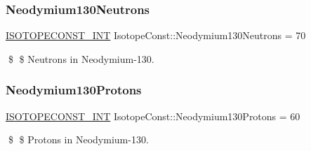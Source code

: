 \subsubsection{\texorpdfstring{Neodymium130\+Neutrons}{Neodymium130Neutrons}}
{\footnotesize\ttfamily \mbox{\hyperlink{group___isotope_const-_macros_ga5f18360b3e99483a35c32d789e62621c}{I\+S\+O\+T\+O\+P\+E\+C\+O\+N\+S\+T\+\_\+\+I\+NT}} Isotope\+Const\+::\+Neodymium130\+Neutrons = 70}

\$ \$ Neutrons in Neodymium-\/130. \mbox{\label{group___isotope_const-_neodymium-_nd130_gabfd553c6628d89c6bb9f44a4ee5091ab}} 
\subsubsection{\texorpdfstring{Neodymium130\+Protons}{Neodymium130Protons}}
{\footnotesize\ttfamily \mbox{\hyperlink{group___isotope_const-_macros_ga5f18360b3e99483a35c32d789e62621c}{I\+S\+O\+T\+O\+P\+E\+C\+O\+N\+S\+T\+\_\+\+I\+NT}} Isotope\+Const\+::\+Neodymium130\+Protons = 60}

\$ \$ Protons in Neodymium-\/130. 